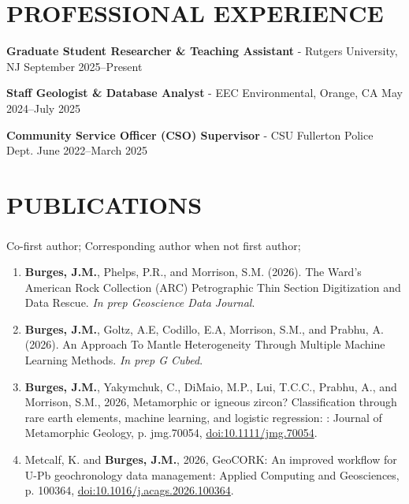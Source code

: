 \documentclass{res} %
\newcommand\reverselabel[1]{%
  \def\theenumi{}%
  \renewcommand\makelabel[1]{%
    \def\tmp{##1}%
    \ifx\tmp\empty
      \null
    \else
      \makebox[\dimexpr\labelwidth-3pt\relax][r]{%
        \the\numexpr#1-\value{enumi}+1\relax.}%
    \fi}}
\begin{document}
\begin{resume}
\section{\Large{PROFESSIONAL EXPERIENCE}}

\textbf{Graduate Student Researcher \& Teaching Assistant}  - Rutgers University, NJ \hfill September 2025–Present


\textbf{Staff Geologist \& Database Analyst} - EEC Environmental, Orange, CA \hfill May 2024–July 2025

\textbf{Community Service Officer (CSO) Supervisor} - CSU Fullerton Police Dept. \hfill June 2022–March 2025

\section{\Large{PUBLICATIONS}} 

\medskip
\noindent
\textsuperscript{\dag}Co-first author; 
\textsuperscript{\ddag}Corresponding author when not first author;
\par\medskip

\begin{enumerate}
\reverselabel{4}


    \item \textbf{Burges, J.M.}, Phelps, P.R., and Morrison, S.M. (2026). The Ward’s American Rock Collection (ARC) Petrographic Thin Section Digitization and Data Rescue. \textit {In prep Geoscience Data Journal}.

    \item \textbf{Burges, J.M.}, Goltz, A.E, Codillo, E.A, Morrison, S.M., and Prabhu, A. (2026). An Approach To Mantle Heterogeneity Through Multiple Machine Learning Methods. \textit {In prep G Cubed}.
    
    \item \textbf{Burges, J.M.}, Yakymchuk, C., DiMaio, M.P., Lui, T.C.C., Prabhu, A., and Morrison, S.M., 2026, Metamorphic or igneous zircon? Classification through rare earth elements, machine learning, and logistic regression: : Journal of Metamorphic Geology, p. jmg.70054, \href{doi:10.1111/jmg.70054}{doi:10.1111/jmg.70054}.
  
    \item Metcalf, K. and \textbf{Burges, J.M.}, 2026, GeoCORK: An improved workflow for U-Pb geochronology data management: Applied Computing and Geosciences, p. 100364, \href{doi:10.1016/j.acags.2026.100364}{doi:10.1016/j.acags.2026.100364}.
\end{enumerate}


\end{resume}
\end{document}
